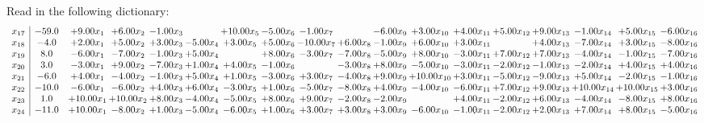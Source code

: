 \documentclass[9pt]{article}
\begin{document}
Read in the following dictionary:
\[\begin{array}{c| c c@{\hskip 2pt} c@{\hskip 2pt} c@{\hskip 2pt} c@{\hskip 2pt} c@{\hskip 2pt} c@{\hskip 2pt} c@{\hskip 2pt} c@{\hskip 2pt} c@{\hskip 2pt} c@{\hskip 2pt} c@{\hskip 2pt} c@{\hskip 2pt} c@{\hskip 2pt} c@{\hskip 2pt} c@{\hskip 2pt} c@{\hskip 2pt} }
 x_{17}   &  -59.0 & +  9.00 x_{1} & +  6.00 x_{2} & -1.00 x_{3} &   & + 10.00 x_{5} & -5.00 x_{6} & -1.00 x_{7} &   & -6.00 x_{9} & +  3.00 x_{10} & +  4.00 x_{11} & +  5.00 x_{12} & +  9.00 x_{13} & -1.00 x_{14} & +  5.00 x_{15} & -6.00 x_{16}\\
 x_{18}   &  -4.0 & +  2.00 x_{1} & +  5.00 x_{2} & +  3.00 x_{3} & -5.00 x_{4} & +  3.00 x_{5} & +  5.00 x_{6} & -10.00 x_{7} & +  6.00 x_{8} & -1.00 x_{9} & +  6.00 x_{10} & +  3.00 x_{11} &   & +  4.00 x_{13} & -7.00 x_{14} & +  3.00 x_{15} & -8.00 x_{16}\\
 x_{19}   &  8.0 & -6.00 x_{1} & -7.00 x_{2} & -1.00 x_{3} & +  5.00 x_{4} &   & +  8.00 x_{6} & -3.00 x_{7} & -7.00 x_{8} & -5.00 x_{9} & +  8.00 x_{10} & -3.00 x_{11} & +  7.00 x_{12} & +  7.00 x_{13} & -4.00 x_{14} & -1.00 x_{15} & -7.00 x_{16}\\
 x_{20}   &  3.0 & -3.00 x_{1} & +  9.00 x_{2} & -7.00 x_{3} & +  1.00 x_{4} & +  4.00 x_{5} & -1.00 x_{6} &   & -3.00 x_{8} & +  8.00 x_{9} & -5.00 x_{10} & -3.00 x_{11} & -2.00 x_{12} & -1.00 x_{13} & -2.00 x_{14} & +  4.00 x_{15} & +  4.00 x_{16}\\
 x_{21}   &  -6.0 & +  4.00 x_{1} & -4.00 x_{2} & -1.00 x_{3} & +  5.00 x_{4} & +  1.00 x_{5} & -3.00 x_{6} & +  3.00 x_{7} & -4.00 x_{8} & +  9.00 x_{9} & + 10.00 x_{10} & +  3.00 x_{11} & -5.00 x_{12} & -9.00 x_{13} & +  5.00 x_{14} & -2.00 x_{15} & -1.00 x_{16}\\
 x_{22}   &  -10.0 & -6.00 x_{1} & -6.00 x_{2} & +  4.00 x_{3} & +  6.00 x_{4} & -3.00 x_{5} & +  1.00 x_{6} & -5.00 x_{7} & -8.00 x_{8} & +  4.00 x_{9} & -4.00 x_{10} & -6.00 x_{11} & +  7.00 x_{12} & +  9.00 x_{13} & + 10.00 x_{14} & + 10.00 x_{15} & +  3.00 x_{16}\\
 x_{23}   &  1.0 & + 10.00 x_{1} & + 10.00 x_{2} & +  8.00 x_{3} & -4.00 x_{4} & -5.00 x_{5} & +  8.00 x_{6} & +  9.00 x_{7} & -2.00 x_{8} & -2.00 x_{9} &   & +  4.00 x_{11} & -2.00 x_{12} & +  6.00 x_{13} & -4.00 x_{14} & -8.00 x_{15} & +  8.00 x_{16}\\
 x_{24}   &  -11.0 & + 10.00 x_{1} & -8.00 x_{2} & +  1.00 x_{3} & -5.00 x_{4} & -6.00 x_{5} & +  1.00 x_{6} & +  3.00 x_{7} & +  3.00 x_{8} & +  3.00 x_{9} & -6.00 x_{10} & -1.00 x_{11} & -2.00 x_{12} & +  2.00 x_{13} & +  7.00 x_{14} & +  8.00 x_{15} & -5.00 x_{16}\\

\end{array}\]
\end{document}
